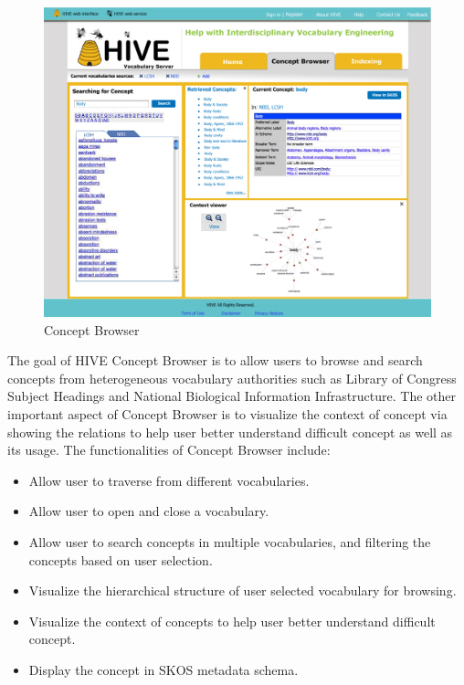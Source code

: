 \begin{figure}
\centering
\includegraphics[width=400pt]{img/browser.pdf}
\caption{Concept Browser}
\label{browser}
\end{figure}

The goal of HIVE Concept Browser is to allow users to browse and search concepts from heterogeneous 
vocabulary authorities such as Library of Congress Subject Headings and National Biological Information 
Infrastructure. The other important aspect of Concept Browser is to visualize the context of concept 
via showing the relations to help user better understand difficult concept as well as its usage. 
The functionalities of Concept Browser include:

\begin{itemize}
\item Allow user to traverse from different vocabularies.
\item Allow user to open and close a vocabulary.
\item Allow user to search concepts in multiple vocabularies, and filtering the concepts based on user 
selection.
\item Visualize the hierarchical structure of user selected vocabulary for browsing.
\item Visualize the context of concepts to help user better understand difficult concept.
\item Display the concept in SKOS metadata schema.
\end{itemize}


